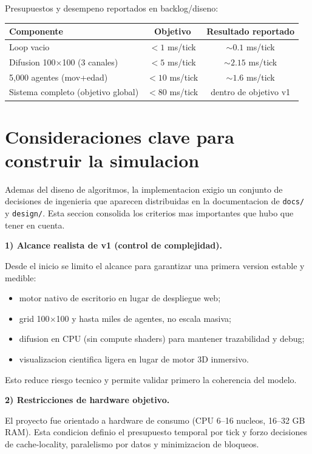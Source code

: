 \documentclass[11pt]{article}
\begin{document}
Presupuestos y desempeno reportados en backlog/diseno:

\begin{center}
\begin{tabular}{|l|c|c|}
\hline
Componente & Objetivo & Resultado reportado \\
\hline
Loop vacio & $<1$ ms/tick & $\sim 0.1$ ms/tick \\
Difusion 100\(\times\)100 (3 canales) & $<5$ ms/tick & $\sim 2.15$ ms/tick \\
5,000 agentes (mov+edad) & $<10$ ms/tick & $\sim 1.6$ ms/tick \\
Sistema completo (objetivo global) & $<80$ ms/tick & dentro de objetivo v1 \\
\hline
\end{tabular}
\end{center}

\section*{Consideraciones clave para construir la simulacion}

Ademas del diseno de algoritmos, la implementacion exigio un conjunto de decisiones de ingenieria que aparecen distribuidas en la documentacion de \texttt{docs/} y \texttt{design/}. Esta seccion consolida los criterios mas importantes que hubo que tener en cuenta.

\textbf{1) Alcance realista de v1 (control de complejidad).}

Desde el inicio se limito el alcance para garantizar una primera version estable y medible:

\begin{itemize}
  \item motor nativo de escritorio en lugar de despliegue web;
  \item grid 100\(\times\)100 y hasta miles de agentes, no escala masiva;
  \item difusion en CPU (sin compute shaders) para mantener trazabilidad y debug;
  \item visualizacion cientifica ligera en lugar de motor 3D inmersivo.
\end{itemize}

Esto reduce riesgo tecnico y permite validar primero la coherencia del modelo.

\textbf{2) Restricciones de hardware objetivo.}

El proyecto fue orientado a hardware de consumo (CPU 6--16 nucleos, 16--32 GB RAM). Esta condicion definio el presupuesto temporal por tick y forzo decisiones de cache-locality, paralelismo por datos y minimizacion de bloqueos.
\end{document}
